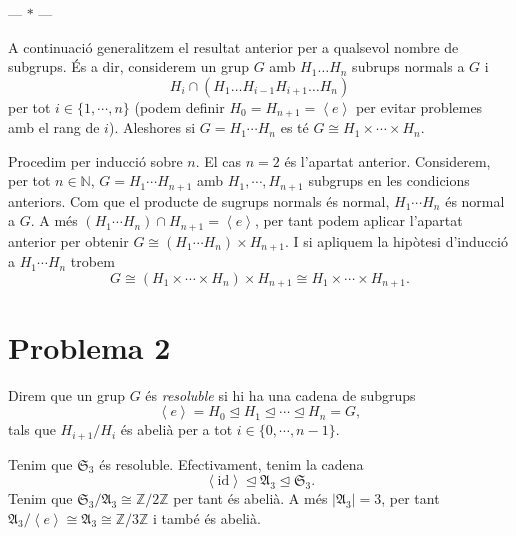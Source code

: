 \documentclass[12pt]{article}
\renewcommand{\S}{\mathfrak{S}}
\newcommand{\A}{\mathfrak{A}}
\newcommand{\Z}{\mathbb{Z}}
\newcommand{\gen}[1]{\left\langle #1 \right\rangle}
\newcommand{\abs}[1]{\left\lvert #1 \right\rvert}
\newcommand{\normal}{\trianglelefteq}
\newcommand{\id}{\mathrm{id}}
\newcommand{\parbreak}{
	\begin{center}
		--- $\ast$ ---
	\end{center} 
}
\begin{document}
\parbreak

A continuació generalitzem el resultat anterior per a qualsevol nombre de subgrups. És a dir, considerem un grup \( G \) amb \( H_1 \dots H_n \) subrups normals a \( G \) i 
\begin{equation*}
	H_i \cap \left(H_1 \dots H_{i-1} H_{i+1} \dots H_n\right) 
\end{equation*}
per tot \( i \in \{1, \cdots, n\} \) (podem definir \( H_0 = H_{n+1} = \gen{e} \) per evitar problemes amb el rang de \( i \)). Aleshores si \( G = H_1\cdots H_n \) es té \( G \cong H_1 \times \cdots \times H_n \).

Procedim per inducció sobre \( n \). El cas \( n = 2 \) és l'apartat anterior. Considerem, per tot \( n \in \mathbb{N} \), \( G = H_1 \cdots H_{n+1} \) amb \( H_1, \cdots , H_{n+1} \) subgrups en les condicions anteriors. Com que el producte de sugrups normals és normal, \( H_1\cdots H_n \) és normal a \( G \). A més \( \left(H_1 \cdots H_n \right) \cap H_{n+1} = \gen{e} \), per tant podem aplicar l'apartat anterior per obtenir \( G \cong \left(H_1 \cdots H_n\right) \times H_{n+1} \). I si apliquem la hipòtesi d'inducció a \( H_1 \cdots H_n \) trobem 
\begin{equation*}
	G \cong \left(H_1 \times \cdots \times H_n\right) \times H_{n+1} \cong H_1 \times \cdots \times H_{n+1}.
\end{equation*}

\pagebreak
\section*{Problema 2}
Direm que un grup \( G \) és \emph{resoluble} si hi ha una cadena de subgrups
\begin{equation*}
	\gen{e} = H_0 \normal H_1 \normal \cdots \normal H_n = G,
\end{equation*}
tals que \( H_{i+1}/H_i \) és abelià per a tot \( i \in \{0,\cdots , n -1 \} \). 

Tenim que \( \S_3 \) és resoluble. Efectivament, tenim la cadena 
\begin{equation*}
	\gen{\id} \normal \A_3 \normal \S_3.
\end{equation*}
Tenim que \( \S_3/\A_3 \cong \Z / 2\Z \) per tant és abelià. A més \( \abs{\A_3} = 3 \), per tant \( \A_3 / \gen{e} \cong \A_3 \cong \Z / 3\Z \) i també és abelià.  
\end{document}
